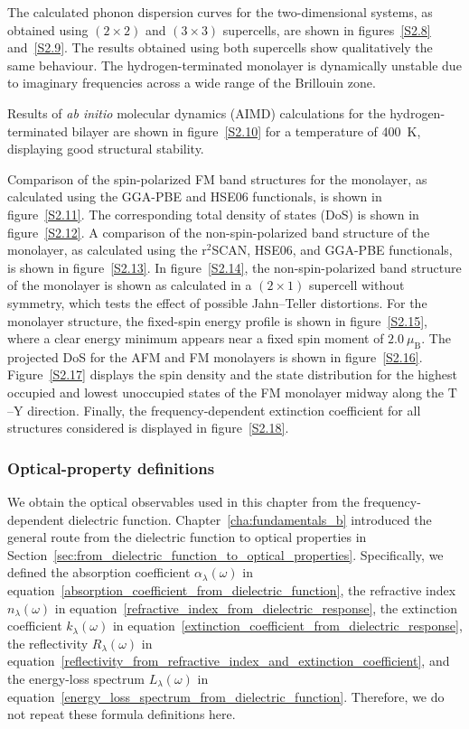 The calculated phonon dispersion curves for the two-dimensional systems,
as obtained using $(2 \times 2)$ and $(3 \times 3)$ supercells, are shown in figures~\ref{S2.8} and~\ref{S2.9}.
The results obtained using both supercells show qualitatively the same behaviour.
The hydrogen-terminated monolayer is dynamically unstable due to imaginary frequencies across a wide range of the Brillouin zone.

Results of \textit{ab initio} molecular dynamics (AIMD) calculations for the hydrogen-terminated bilayer are shown in figure~\ref{S2.10} for a temperature of \qty{400}{K}, displaying good structural stability.

Comparison of the spin-polarized FM band structures for the monolayer,
as calculated using the GGA-PBE and HSE06 functionals, is shown in figure~\ref{S2.11}.
The corresponding total density of states (DoS) is shown in figure~\ref{S2.12}.
A comparison of the non-spin-polarized band structure of the monolayer,
as calculated using the r$^{2}$SCAN, HSE06, and GGA-PBE functionals, is shown in figure~\ref{S2.13}.
In figure~\ref{S2.14}, the non-spin-polarized band structure of the monolayer is shown as calculated in a $(2\times1)$ supercell without symmetry,
which tests the effect of possible Jahn--Teller distortions.
For the monolayer structure, the fixed-spin energy profile is shown in figure~\ref{S2.15}, where a clear energy minimum appears near a fixed spin moment of $2.0~\mu_{\mathrm{B}}$.
The projected DoS for the AFM and FM monolayers is shown in figure~\ref{S2.16}.
Figure~\ref{S2.17} displays the spin density and the state distribution for the highest occupied and lowest unoccupied states of the FM monolayer midway along the $\mathrm{T}$--$\mathrm{Y}$ direction.
Finally, the frequency-dependent extinction coefficient for all structures considered is displayed in figure~\ref{S2.18}.

\subsubsection*{Optical-property definitions}

We obtain the optical observables used in this chapter from the frequency-dependent dielectric function.
Chapter~\ref{cha:fundamentals_b} introduced the general route from the dielectric function to optical properties in Section~\ref{sec:from_dielectric_function_to_optical_properties}.
Specifically,
we defined the absorption coefficient $\alpha_{\lambda}(\omega)$ in equation~\eqref{absorption_coefficient_from_dielectric_function},
the refractive index $n_{\lambda}(\omega)$ in equation~\eqref{refractive_index_from_dielectric_response},
the extinction coefficient $k_{\lambda}(\omega)$ in equation~\eqref{extinction_coefficient_from_dielectric_response},
the reflectivity $R_{\lambda}(\omega)$ in equation~\eqref{reflectivity_from_refractive_index_and_extinction_coefficient},
and the energy-loss spectrum $L_{\lambda}(\omega)$ in equation~\eqref{energy_loss_spectrum_from_dielectric_function}.
Therefore, we do not repeat these formula definitions here.

